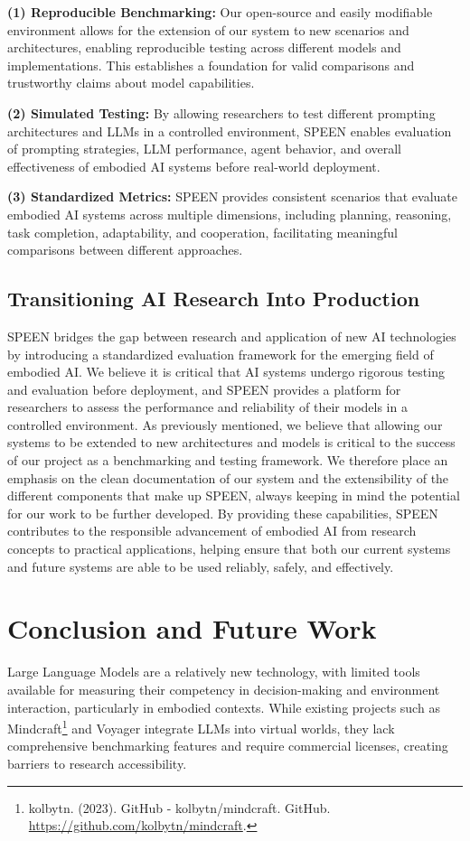 \documentclass{article}
\begin{document}
\textbf{(1) Reproducible Benchmarking:} Our open-source and easily modifiable environment allows for the extension of our system to new scenarios and architectures, enabling reproducible testing across different models and implementations.
This establishes a foundation for valid comparisons and trustworthy claims about model capabilities.

\textbf{(2) Simulated Testing:} By allowing researchers to test different prompting architectures and LLMs in a controlled environment, SPEEN enables evaluation of prompting strategies, LLM performance, agent behavior, and overall effectiveness of embodied AI systems before real-world deployment.

\textbf{(3) Standardized Metrics:} SPEEN provides consistent scenarios that evaluate embodied AI systems across multiple dimensions, including planning, reasoning, task completion, adaptability, and cooperation, facilitating meaningful comparisons between different approaches.

\subsection{Transitioning AI Research Into Production}
SPEEN bridges the gap between research and application of new AI technologies by introducing a standardized evaluation framework for the emerging field of embodied AI.
We believe it is critical that AI systems undergo rigorous testing and evaluation before deployment, and SPEEN provides a platform for researchers to assess the performance and reliability of their models in a controlled environment.
As previously mentioned, we believe that allowing our systems to be extended to new architectures and models is critical to the success of our project as a benchmarking and testing framework.
We therefore place an emphasis on the clean documentation of our system and the extensibility of the different components that make up SPEEN, always keeping in mind the potential for our work to be further developed.
By providing these capabilities, SPEEN contributes to the responsible advancement of embodied AI from research concepts to practical applications, helping ensure that both our current systems and future systems are able to be used reliably, safely, and effectively.

\section{Conclusion and Future Work}
Large Language Models are a relatively new technology, with limited tools available for measuring their competency in decision-making and environment interaction, particularly in embodied contexts. While existing projects such as Mindcraft\footnote{kolbytn. (2023). GitHub - kolbytn/mindcraft. GitHub. \url{https://github.com/kolbytn/mindcraft}.} and Voyager integrate LLMs into virtual worlds, they lack comprehensive benchmarking features and require commercial licenses, creating barriers to research accessibility.
\end{document}
